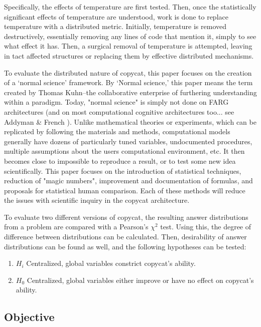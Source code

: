 \documentclass[a4paper]{article}
\begin{document}
Specifically, the effects of temperature are first tested. 
Then, once the statistically significant effects of temperature are understood, work is done to replace temperature with a distributed metric.
Initially, temperature is removed destructively, essentially removing any lines of code that mention it, simply to see what effect it has.
Then, a surgical removal of temperature is attempted, leaving in tact affected structures or replacing them by effective distributed mechanisms.

To evaluate the distributed nature of copycat, this paper focuses on the creation of a `normal science' framework.
By `Normal science,' this paper means the term created by Thomas Kuhn--the collaborative enterprise of furthering understanding within a paradigm. 
Today, "normal science" is simply not done on FARG architectures (and on most computational cognitive architectures too... see Addyman \& French \cite{compmodeling}). 
Unlike mathematical theories or experiments, which can be replicated by following the materials and methods, computational models generally have dozens of particularly tuned variables, undocumented procedures, multiple assumptions about the users computational environment, etc.
It then becomes close to impossible to reproduce a result, or to test some new idea scientifically. 
This paper focuses on the introduction of statistical techniques, reduction of "magic numbers", improvement and documentation of formulas, and proposals for statistical human comparison.
Each of these methods will reduce the issues with scientific inquiry in the copycat architecture.

To evaluate two different versions of copycat, the resulting answer distributions from a problem are compared with a Pearson's $\chi^2$ test.
Using this, the degree of difference between distributions can be calculated.
Then, desirability of answer distributions can be found as well, and the following hypotheses can be tested:

\begin{enumerate}
    \item $H_i$ Centralized, global variables constrict copycat's ability.
    \item $H_0$ Centralized, global variables either improve or have no effect on copycat's ability.
\end{enumerate}

\subsection{Objective}
\end{document}
